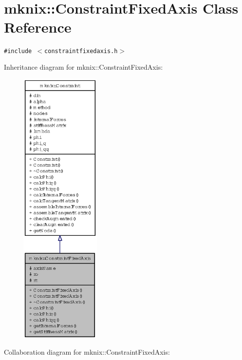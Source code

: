 \hypertarget{classmknix_1_1ConstraintFixedAxis}{
\section{mknix::ConstraintFixedAxis Class Reference}
\label{classmknix_1_1ConstraintFixedAxis}
}
{\tt \#include $<$constraintfixedaxis.h$>$}

Inheritance diagram for mknix::ConstraintFixedAxis:\nopagebreak
\begin{figure}[H]
\begin{center}
\leavevmode
\includegraphics[height=400pt]{classmknix_1_1ConstraintFixedAxis__inherit__graph}
\end{center}
\end{figure}
Collaboration diagram for mknix::ConstraintFixedAxis:\nopagebreak
